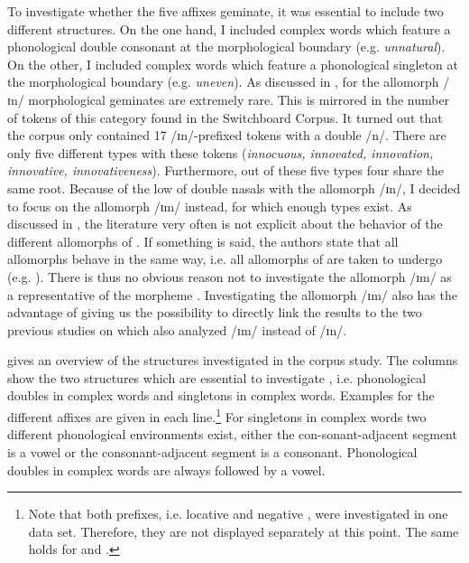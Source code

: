 To investigate whether the five affixes {geminate}, it was essential to include two different structures. On the one hand, I included complex words which feature a phonological double consonant at the morphological boundary (e.g. \textit{unnatural}). On the other, I included complex words which feature a phonological singleton at the morphological boundary (e.g. \textit{uneven}). 
As discussed in , for the allomorph /ɪn/ morphological geminates are extremely rare. This is mirrored in the number of tokens of this category found in the Switchboard Corpus. It turned out that the corpus only contained 17 /ɪn/-prefixed tokens with a double /n/. There are only five different types with these tokens (\textit{innocuous, innovated, innovation, innovative, innovativeness}). Furthermore, out of these five types four share the same root. Because of the low  of double nasals with the allomorph /ɪn/, I decided to focus on the allomorph /ɪm/ instead, for which enough types exist. 
As discussed in , the literature very often is not explicit about the  behavior of the different allomorphs of  . If something is said, the authors state that all allomorphs behave in the same way, i.e. all allomorphs of  are taken to undergo  (e.g. \citealt{Borowsky.1986, Cruttenden.2014}). There is thus no obvious reason not to investigate the allomorph /ɪm/ as a representative of the morpheme  .  Investigating the allomorph /ɪm/ also has the advantage of giving us the possibility to directly link the results to the two previous studies on  which also analyzed /ɪm/ instead of /ɪn/. 

 gives an overview of  the structures investigated in the corpus study. The columns show the two structures which are essential to investigate , i.e. phonological doubles in complex words and singletons in complex words. Examples for the different affixes are given in each line.\footnote{Note that both  prefixes, i.e. locative and negative , were investigated in one data set. Therefore, they are not displayed separately at this point. The same holds for  and .} 
For singletons in complex words two different phonological environments exist, either the con-sonant-adjacent segment is a vowel or the consonant-adjacent segment is a consonant. Phonological doubles in complex words are always followed by a vowel. 



